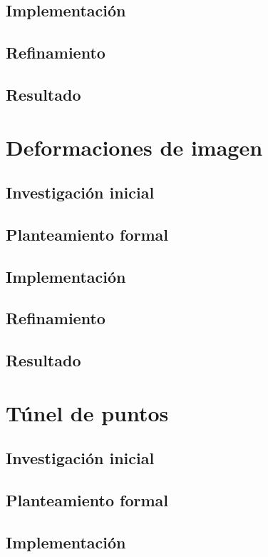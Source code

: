 \subsection{Implementación}
\subsection{Refinamiento}
\subsection{Resultado}

\section{Deformaciones de imagen}

\subsection{Investigación inicial}
\subsection{Planteamiento formal}
\subsection{Implementación}
\subsection{Refinamiento}
\subsection{Resultado}

\section{Túnel de puntos}

\subsection{Investigación inicial}
\subsection{Planteamiento formal}
\subsection{Implementación}
